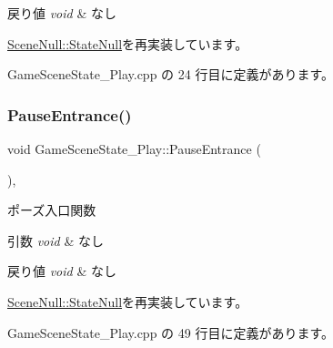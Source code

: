 \begin{DoxyRetVals}{戻り値}
{\em void} & なし \\
\hline
\end{DoxyRetVals}


\mbox{\hyperlink{class_scene_null_1_1_state_null_ac0b3f1adf01b580144337e37a847131f}{Scene\+Null\+::\+State\+Null}}を再実装しています。



 Game\+Scene\+State\+\_\+\+Play.\+cpp の 24 行目に定義があります。

\mbox{\label{class_game_scene_state___play_a3bd935dc9cf71fc77d35a1e9001b0d94}} 
\subsubsection{\texorpdfstring{Pause\+Entrance()}{PauseEntrance()}}
{\footnotesize\ttfamily void Game\+Scene\+State\+\_\+\+Play\+::\+Pause\+Entrance (\begin{DoxyParamCaption}{ }\end{DoxyParamCaption})\hspace{0.3cm}{\ttfamily [override]}, {\ttfamily [virtual]}}



ポーズ入口関数 


\begin{DoxyParams}{引数}
{\em void} & なし \\
\hline
\end{DoxyParams}

\begin{DoxyRetVals}{戻り値}
{\em void} & なし \\
\hline
\end{DoxyRetVals}


\mbox{\hyperlink{class_scene_null_1_1_state_null_a0a14205bef6c8f73c3ef6b785b104f02}{Scene\+Null\+::\+State\+Null}}を再実装しています。



 Game\+Scene\+State\+\_\+\+Play.\+cpp の 49 行目に定義があります。

\mbox{\label{class_game_scene_state___play_ae564bcc1a570009c144722f252cb73ff}} 
